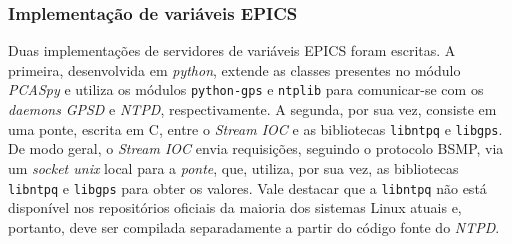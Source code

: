 % 
% 
% 

\subsubsection{Implementação de variáveis EPICS}

Duas implementações de servidores de variáveis EPICS foram escritas. A primeira,
desenvolvida em \textit{python}, extende as classes presentes no módulo
\textit{PCASpy} e utiliza os módulos \texttt{python-gps} e \texttt{ntplib} para
comunicar-se com os \textit{daemons} \textit{GPSD} e \textit{NTPD},
respectivamente. A segunda, por sua vez, consiste em uma ponte, escrita em C,
entre o \textit{Stream IOC} e as bibliotecas \texttt{libntpq} e \texttt{libgps}.
De modo geral, o \textit{Stream IOC} envia requisições, seguindo o protocolo
BSMP, via um \textit{socket unix} local para a \textit{ponte}, que, utiliza, por
sua vez, as bibliotecas \texttt{libntpq} e \texttt{libgps} para obter os valores. Vale
destacar que a \texttt{libntpq} não está disponível nos repositórios oficiais da
maioria dos sistemas Linux atuais e, portanto, deve ser compilada separadamente
a partir do código fonte do \textit{NTPD}.

\vspace{12pt}


